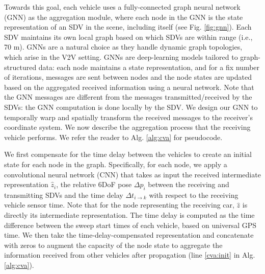 \documentclass[runningheads]{llncs}
\begin{document}
Towards this goal, each vehicle uses a fully-connected graph neural network (GNN) \cite{schlichtkrull2018modeling} as the aggregation module,
where each node in the GNN is the state representation of an SDV in the scene, including itself (see Fig. \ref{fig:gnn}).
Each SDV maintains its own local graph based on which SDVs are within range (i.e., 70 m). GNNs are a natural choice as they handle dynamic graph topologies, which arise in the V2V setting. 
GNNs are deep-learning models tailored to graph-structured data: each node maintains a state representation, and for a fix number of iterations, messages are sent between nodes and the node states are updated based on the aggregated received information using a neural network.
Note that the GNN messages 
are different from
the messages transmitted/received by the SDVs: the GNN computation is done locally by the SDV.
We design our GNN to temporally warp and spatially transform the received messages to the receiver's coordinate system.
We now describe the aggregation process that 
the receiving vehicle performs. %
We  refer the reader to  Alg. \ref{alg:cva} for  pseudocode. %

We first compensate for the time delay between the vehicles to create an initial state for each node in the graph.
Specifically,  for each node, we apply a convolutional neural network (CNN) that takes as input the received intermediate representation $\hat{z}_i$, the relative 6DoF pose  $\Delta p_i$ between the receiving and transmitting SDVs  and the time delay $\Delta t_{i \rightarrow k}$ with respect to the receiving vehicle sensor time. Note that for the node representing the receiving car, $\hat{z}$ is directly its intermediate representation. 
The time delay is computed as the time difference between the sweep start times of each vehicle, based on universal GPS time.
We then take the time-delay-compensated representation and concatenate with zeros to augment the capacity of the node state
to aggregate the information received from other vehicles after propagation (line \ref{cva:init} in Alg. \ref{alg:cva}).
\end{document}
